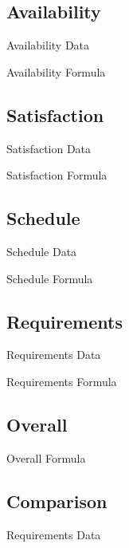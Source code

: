     \subsection{Availability}
        \begin{frame}{Availability Data}
        \end{frame} 
        \begin{frame}{Availability Formula }
        \end{frame} 
    \subsection{Satisfaction}
        \begin{frame}{Satisfaction Data}
        \end{frame} 
        \begin{frame}{Satisfaction Formula }
        \end{frame} 
    \subsection{Schedule}
        \begin{frame}{Schedule Data}
        \end{frame} 
        \begin{frame}{Schedule Formula }
        \end{frame} 
    \subsection{Requirements}
        \begin{frame}{Requirements Data}
        \end{frame} 
        \begin{frame}{Requirements Formula }
        \end{frame} 
    \subsection{Overall}
        \begin{frame}{Overall Formula}
        \end{frame} 

    \subsection{Comparison}
        \begin{frame}{Requirements Data}
        \end{frame} 
    
